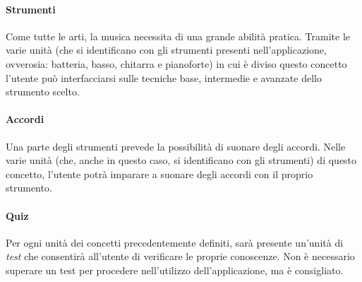 \paragraph{Strumenti} Come tutte le arti, la musica necessita di una grande
abilità pratica. Tramite le varie unità (che si identificano con gli strumenti
presenti nell'applicazione, ovverosia: batteria, basso, chitarra e pianoforte)
in cui è diviso questo concetto l'utente può interfacciarsi sulle tecniche base,
intermedie e avanzate dello strumento scelto. 

\paragraph{Accordi} Una parte degli strumenti prevede la possibilità di suonare
degli accordi. Nelle varie unità (che, anche in questo caso, si identificano con
gli strumenti) di questo concetto, l'utente potrà imparare a suonare degli
accordi con il proprio strumento. 

\paragraph{Quiz} Per ogni unità dei concetti precedentemente definiti, sarà
presente un'unità di \textit{test} che consentirà all'utente di verificare le
proprie conoscenze. Non è necessario superare un test per procedere
nell'utilizzo dell'applicazione, ma è consigliato.

